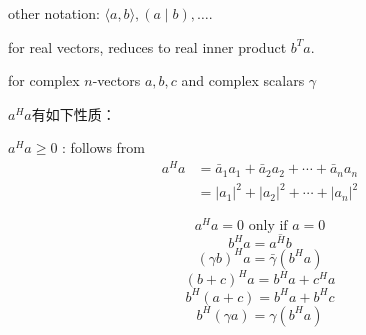 other notation: $ \langle a, b\rangle,(a \mid b), \ldots $.

for real vectors, reduces to real inner product $ b^{T} a $.

for complex $ n $-vectors $ a, b, c $ and complex scalars $ \gamma $

\begin{theorem}[$a^H a$的性质]
    $a^H a$有如下性质：


    $ a^{H} a \geq 0 $ : follows from
$$
\begin{aligned}
a^{H} a &=\bar{a}_{1} a_{1}+\bar{a}_{2} a_{2}+\cdots+\bar{a}_{n} a_{n} \\
&=\left|a_{1}\right|^{2}+\left|a_{2}\right|^{2}+\cdots+\left|a_{n}\right|^{2}
\end{aligned}
$$

    $$ a^{H} a=0 \text{ only if } a=0 $$
    $$ b^{H} a=\overline{a^{H} b} $$
 $$ (\gamma b)^{H} a=\bar{\gamma}\left(b^{H} a\right) $$
 $$ (b+c)^{H} a=b^{H} a+c^{H} a $$
 $$ b^{H}(a+c)=b^{H} a+b^{H} c $$
    $$ b^{H}(\gamma a)=\gamma\left(b^{H} a\right) $$
\end{theorem}


